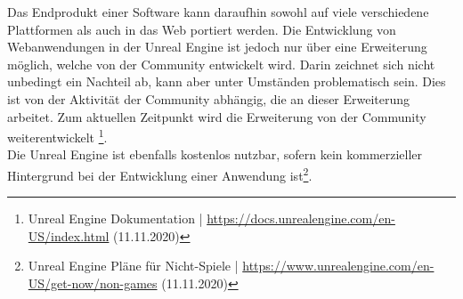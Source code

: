 \documentclass[a4paper,12pt,oneside]{article}
\begin{document}
        Das Endprodukt einer Software kann daraufhin sowohl auf viele verschiedene Plattformen 
        als auch in das Web portiert werden. Die Entwicklung von Webanwendungen
        in der Unreal Engine ist jedoch nur über eine Erweiterung möglich, welche von 
        der Community entwickelt wird. Darin zeichnet sich nicht unbedingt ein Nachteil ab, 
        kann aber unter Umständen problematisch sein. Dies ist von der Aktivität 
        der Community abhängig, die an dieser Erweiterung arbeitet. Zum aktuellen
        Zeitpunkt wird die Erweiterung von der Community weiterentwickelt
        \footnote{Unreal Engine Dokumentation | \url{https://docs.unrealengine.com/en-US/index.html} (11.11.2020)}.
        \\
        Die Unreal Engine ist ebenfalls kostenlos nutzbar, sofern kein kommerzieller
        Hintergrund bei der Entwicklung einer Anwendung ist\footnote{Unreal Engine Pläne für Nicht-Spiele | \url{https://www.unrealengine.com/en-US/get-now/non-games} (11.11.2020)}.
\end{document}
